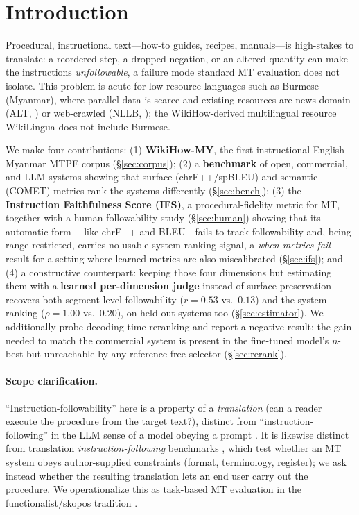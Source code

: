 \documentclass[11pt]{article}
\begin{document}
\section{Introduction}
Procedural, instructional text---how-to guides, recipes, manuals---is high-stakes to
translate: a reordered step, a dropped negation, or an altered quantity can make the
instructions \emph{unfollowable}, a failure mode standard MT evaluation does not isolate.
This problem is acute for low-resource languages such as Burmese (Myanmar), where parallel
data is scarce and existing resources are news-domain (ALT, \citealp{alt2016}) or
web-crawled (NLLB, \citealp{nllb2024}); the WikiHow-derived multilingual resource
WikiLingua \citep{wikilingua2020} does not include Burmese.

We make four contributions:
(1) \textbf{WikiHow-MY}, the first instructional English--Myanmar MTPE corpus
(\S\ref{sec:corpus});
(2) a \textbf{benchmark} of open, commercial, and LLM systems showing that surface
(chrF++/spBLEU) and semantic (COMET) metrics rank the systems differently (\S\ref{sec:bench});
(3) the \textbf{Instruction Faithfulness Score (IFS)}, a procedural-fidelity metric for MT,
together with a human-followability study (\S\ref{sec:human}) showing that its automatic form---
like chrF++ and BLEU---fails to track followability and, being range-restricted, carries no
usable system-ranking signal, a
\emph{when-metrics-fail} result for a setting where learned metrics are also miscalibrated
\citep{falcao2024comet,africomet2024} (\S\ref{sec:ifs});
and (4) a constructive counterpart: keeping those four dimensions but estimating them with a
\textbf{learned per-dimension judge} instead of surface preservation recovers both segment-level
followability ($r{=}0.53$ vs.\ $0.13$) and the system ranking ($\rho{=}1.00$ vs.\ $0.20$),
on held-out systems too (\S\ref{sec:estimator}).
We additionally probe decoding-time reranking and report a negative result: the gain
needed to match the commercial system is present in the fine-tuned model's $n$-best but
unreachable by any reference-free selector (\S\ref{sec:rerank}).

\paragraph{Scope clarification.} ``Instruction-followability'' here is a property of a
\emph{translation} (can a reader execute the procedure from the target text?), distinct
from ``instruction-following'' in the LLM sense of a model obeying a prompt
\citep{ifeval2023,xifbench2025}. It is likewise distinct from translation
\emph{instruction-following} benchmarks \citep{ifmtbench2026}, which test whether an MT system
obeys author-supplied constraints (format, terminology, register); we ask instead whether the
resulting translation lets an end user carry out the procedure. We operationalize this as
task-based MT evaluation \citep{gale_taskbased} in the functionalist/skopos tradition
\citep{reissvermeer1984}.
\end{document}
